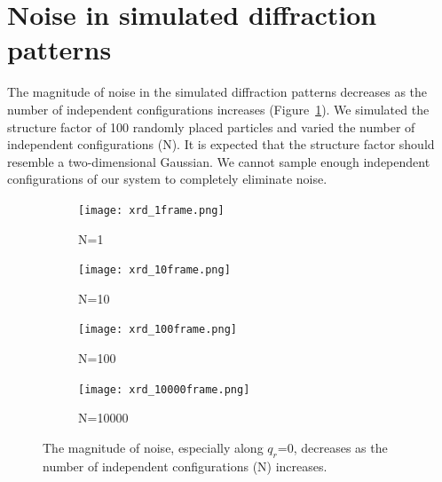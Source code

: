 \documentclass{article}
\begin{document}
  \clearpage
 
  \section{Noise in simulated diffraction patterns}\label{section:xrd_noise}
  
  The magnitude of noise in the simulated diffraction patterns decreases as 
  the number of independent configurations increases (Figure~\ref{fig:xrd_noise}).
  We simulated the structure factor of 100 randomly placed particles and varied 
  the number of independent configurations (N). It is expected that the structure
  factor should resemble a two-dimensional Gaussian. We cannot sample enough 
  independent configurations of our system to completely eliminate noise.
  
  \begin{figure}[!htb]
  \centering
  \begin{subfigure}{0.45\linewidth}
  \centering
  \texttt{[image: xrd\_1frame.png]}
  \caption{N=1}
  \end{subfigure}
  \begin{subfigure}{0.45\linewidth}
  \centering
  \texttt{[image: xrd\_10frame.png]}
  \caption{N=10}
  \end{subfigure}
  \begin{subfigure}{0.45\linewidth}
  \centering
  \texttt{[image: xrd\_100frame.png]}
  \caption{N=100}
  \end{subfigure}
  \begin{subfigure}{0.45\linewidth}
  \centering
  \texttt{[image: xrd\_10000frame.png]}
  \caption{N=10000}
  \end{subfigure}
  \caption{The magnitude of noise, especially along $q_r$=0, decreases
  as the number of independent configurations (N) increases.}\label{fig:xrd_noise}
  \end{figure}
  
\end{document}
